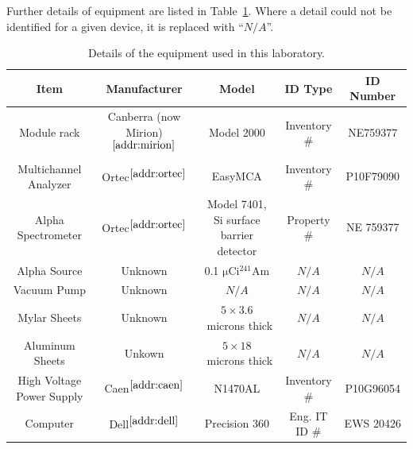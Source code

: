 \documentclass[12pt]{article}
\newcommand{\micCi}{\xspace$\mathrm{\mu Ci}$\xspace}
\newcommand{\AmSrc}{\xspace$^{241}$Am\xspace}
\begin{document}
\newcommand{\na}{$N/A$}
\newcommand{\sref}[1]{$^{\ref{#1}}$}
\FloatBarrier
Further details of equipment are listed in Table~\ref{tab:equip}.
Where a detail could not be identified for a given device, it is replaced with ``\na''.
\begin{table}[!h]
    \centering
    \small
    \caption{Details of the equipment used in this laboratory.}
    \label{tab:equip}
    \scriptsize
    \begin{tabular}{c|cccc}
        Item & Manufacturer & Model & ID Type & ID Number\\\hline
        Module rack & Canberra (now Mirion)\sref{addr:mirion}& Model 2000 & Inventory \# & NE759377 \\
        Multichannel Analyzer & Ortec\sref{addr:ortec} & EasyMCA & Inventory \# & P10F79090 \\
        Alpha Spectrometer & Ortec\sref{addr:ortec} & Model 7401, Si surface barrier detector & Property \# & NE 759377\\
        Alpha Source & Unknown & 0.1 \micCi \AmSrc & \na & \na\\
        Vacuum Pump & Unknown & \na & \na & \na \\
        Mylar Sheets & Unknown & $5\times3.6$~microns thick & \na & \na \\
        Aluminum Sheets & Unkown & $5\times18$~microns thick & \na & \na \\
        High Voltage Power Supply & Caen\sref{addr:caen} & N1470AL & Inventory \# & P10G96054 \\
        Computer & Dell\sref{addr:dell} & Precision 360 & Eng. IT ID \# & EWS 20426 \\


\end{tabular}
\end{table}
\end{document}

